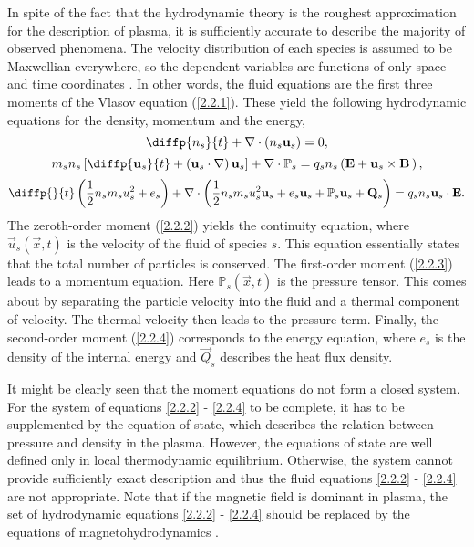 In spite of the fact that the hydrodynamic theory is the roughest approximation for the description of plasma, it is sufficiently accurate to describe the majority of observed phenomena. The velocity distribution of each species is assumed to be Maxwellian everywhere, so the dependent variables are functions of only space and time coordinates \cite{Chen1984}. In other words, the fluid equations are the first three moments of the Vlasov equation (\ref{2.2.1}). These yield the following hydrodynamic equations for the density, momentum and the energy,
\begin{equation}
\label{2.2.2}
\diffp{n_s}{t} + \nabla \cdot \left(n_s \vec{u}_s \right) = 0,
\end{equation}
\begin{equation}
\label{2.2.3}
m_s n_s \left[ \diffp{\vec{u}_s}{t} + \left(\vec{u}_s \cdot \nabla \right) \vec{u}_s \right] + \nabla \cdot \mathbb{P}_s = q_s n_s \left(\vec{E} + \vec{u}_s \times \vec{B} \, \right),
\end{equation}
\begin{equation}
\label{2.2.4}
\diffp{}{t} \left(\frac{1}{2} n_s m_s u_s^2 + e_{s} \right) + \nabla \cdot \left(\frac{1}{2} n_s m_s u_s^2 \vec{u}_s + e_{s} \vec{u}_s + \mathbb{P}_s \vec{u}_s + \vec{Q}_s \right) = q_s n_s \vec{u}_s \cdot \vec{E}.
\end{equation}
The zeroth-order moment (\ref{2.2.2}) yields the continuity equation, where $ \vec{u}_s\left(\vec{x}, t \right) $ is the velocity of the fluid of species $ s $. This equation essentially states that the total number of particles is conserved. The first-order moment (\ref{2.2.3}) leads to a momentum equation. Here $ \mathbb{P}_s\left(\vec{x}, t \right) $ is the pressure tensor. This comes about by separating the particle velocity into the fluid and a thermal component of velocity. The thermal velocity then leads to the pressure term. Finally, the second-order moment (\ref{2.2.4}) corresponds to the energy equation, where $ e_{s} $ is the density of the internal energy and $ \vec{Q}_s $ describes the heat flux density.

It might be clearly seen that the moment equations do not form a closed system. For the system of equations \ref{2.2.2} - \ref{2.2.4} to be complete, it has to be supplemented by the equation of state, which describes the relation between pressure and density in the plasma. However, the equations of state are well defined only in local thermodynamic equilibrium. Otherwise, the system cannot provide sufficiently exact description and thus the fluid equations \ref{2.2.2} - \ref{2.2.4} are not appropriate. Note that if the magnetic field is dominant in plasma, the set of hydrodynamic equations \ref{2.2.2} - \ref{2.2.4} should be replaced by the equations of magnetohydrodynamics \cite{Boyd2003}.